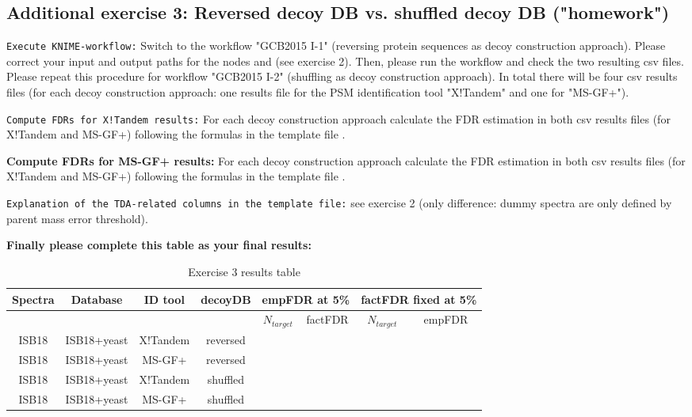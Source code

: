 \subsection{Additional exercise 3: Reversed decoy DB vs. shuffled decoy DB ("homework")}
\begin{task}
    \texttt{Execute KNIME-workflow:} Switch to the workflow "GCB2015 I-1" (reversing protein sequences as decoy construction approach). Please correct your input and output paths for the nodes  and  (see exercise 2). Then, please run the workflow and check the two resulting csv files. Please repeat this procedure for workflow "GCB2015 I-2" (shuffling as decoy construction approach). In total there will be four csv results files (for each decoy construction approach: one results file for the PSM identification tool "X!Tandem" and one for "MS-GF+").
    
    \texttt{Compute FDRs for X!Tandem results:} For each decoy construction approach calculate the FDR estimation in both csv results files (for X!Tandem and MS-GF+) following the formulas in the template file .
    
    \textbf{Compute FDRs for MS-GF+ results:} For each decoy construction approach calculate the FDR estimation in both csv results files (for X!Tandem and MS-GF+) following the formulas in the template file .
    
    \texttt{Explanation of the TDA-related columns in the template file:} see exercise 2 (only difference: dummy spectra are only defined by parent mass error threshold).

    \textbf{Finally please complete this table as your final results:}
\end{task}
\begin{table}[htbp]
	\centering
		\begin{tabular}{|c|c|c|c|c|c|c|c|}
				Spectra & Database & ID tool & decoyDB & \multicolumn{2}{|c|}{empFDR at 5\%} & \multicolumn{2}{|c|}{factFDR fixed at 5\%}\\ \hline
				 &  &  &  & $N_{target}$ & factFDR & $N_{target}$ & empFDR\\ \hline\hline
				ISB18 & ISB18+yeast & X!Tandem & reversed &  &  &  & \\
				ISB18 & ISB18+yeast & MS-GF+ & reversed &  &  &  & \\
				ISB18 & ISB18+yeast & X!Tandem & shuffled &  &  &  & \\
				ISB18 & ISB18+yeast & MS-GF+ & shuffled &  &  &  &
		\end{tabular}
	\caption{Exercise 3 results table}
	\label{tab:Exercise3Results}
\end{table}


